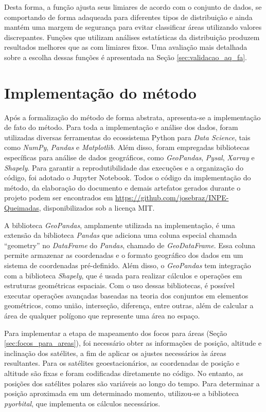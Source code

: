 \documentclass[cic,tc]{iiufrgs}
\begin{document}
Desta forma, a função ajusta seus limiares de acordo com o conjunto de dados, se comportando de forma adaqueada para diferentes tipos de distribuição e ainda mantém uma margem de segurança para evitar classificar áreas utilizando valores discrepantes. Funções que utilizam análises estatísticas da distribuição produzem resultados melhores que as com limiares fixos. Uma avaliação mais detalhada sobre a escolha dessas funções é apresentada na Seção \ref{sec:validacao_aq_fa}.

\section{Implementação do método}
\label{sec:implementacao_metodo}

Após a formalização do método de forma abstrata, apresenta-se a
implementação de fato do método.
%
Para toda a implementação e análise dos dados, foram utilizadas diversas ferramentas do ecossistema Python para \textit{Data Science}, tais como \textit{NumPy}, \textit{Pandas} e \textit{Matplotlib}. Além disso, foram empregadas bibliotecas específicas para análise de dados geográficos, como \textit{GeoPandas}, \textit{Pysal}, \textit{Xarray} e \textit{Shapely}. Para garantir a reprodutibilidade das execuções e a organização do código, foi adotado o Jupyter Notebook. Todos o código da implementação do método, da elaboração do documento e demais artefatos gerados durante o projeto podem ser encontrados em \url{https://github.com/josebraz/INPE-Queimadas}, disponibilizados sob a licença MIT.

A biblioteca \textit{GeoPandas}, amplamente utilizada na implementação, é uma extensão da biblioteca \textit{Pandas} que adiciona uma coluna especial chamada ``geometry'' no \textit{DataFrame} do \textit{Pandas}, chamado de \textit{GeoDataFrame}. Essa coluna permite armazenar as coordenadas e o formato geográfico dos dados em um sistema de coordenadas pré-definido. Além disso, o \textit{GeoPandas} tem integração com a biblioteca \textit{Shapely}, que é usada para realizar cálculos e operações em estruturas geométricas espaciais. Com o uso dessas bibliotecas, é possível executar operações avançadas baseadas na teoria dos conjuntos em elementos geométricos, como união, interseção, diferença, entre outras, além de calcular a área de qualquer polígono que represente uma área no espaço.

Para implementar a etapa de mapeamento dos focos para áreas (Seção \ref{sec:focos_para_areas}), foi necessário obter as informações de posição, altitude e inclinação dos satélites, a fim de aplicar os ajustes necessários às áreas resultantes. Para os satélites geoestacionários, as coordenadas de posição e altitude são fixas e foram codificadas diretamente no código. No entanto, as posições dos satélites polares são variáveis ao longo do tempo. Para determinar a posição aproximada em um determinado momento, utilizou-se a biblioteca \textit{pyorbital}, que implementa os cálculos necessários.
\end{document}
